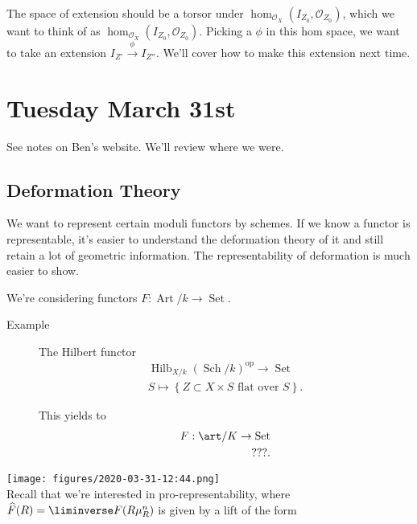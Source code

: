 The space of extension should be a torsor under
\(\hom_{{\mathcal{O}}_X}(I_{Z_0}, {\mathcal{O}}_{Z_0})\), which we want
to think of as \(\hom_{{\mathcal{O}}_X}(I_{Z_0}, {\mathcal{O}}_{Z_0})\).
Picking a \(\phi\) in this hom space, we want to take an extension
\(I_{Z'} \xrightarrow{\phi} I_{Z''}\). We'll cover how to make this
extension next time.

\hypertarget{tuesday-march-31st}{%
\section{Tuesday March 31st}\label{tuesday-march-31st}}

See notes on Ben's website. We'll review where we were.

\hypertarget{deformation-theory}{%
\subsection{Deformation Theory}\label{deformation-theory}}

We want to represent certain moduli functors by schemes. If we know a
functor is representable, it's easier to understand the deformation
theory of it and still retain a lot of geometric information. The
representability of deformation is much easier to show.

We're considering functors
\(F: \operatorname{Art}/k \to {\operatorname{Set}}\).

\begin{description}
\item[Example]
The Hilbert functor
\begin{align*} \operatorname{Hilb}_{X/k} ({\operatorname{Sch}}/k)^\operatorname{op}\to {\operatorname{Set}}\\ S \mapsto \left\{{ Z  \subset  X \times S \text{ flat over } S}\right\} .\end{align*}

This yields to
\begin{align*} F: \art/K \to {\operatorname{Set}}\\ ??? .\end{align*}
\end{description}

\texttt{[image: figures/2020-03-31-12:44.png]}\\

Recall that we're interested in pro-representability, where
\(\widehat{F}(R) = \liminverse F(R\mu_R^n)\) is given by a lift of the
form

